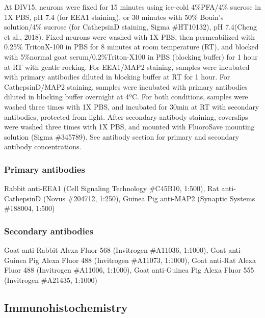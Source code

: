 At DIV15, neurons were fixed for 15 minutes using ice-cold 4\%PFA/4\% sucrose in
1X PBS, pH 7.4 (for EEA1 staining), or 30 minutes with 50\% Bouin’s solution/4\%
sucrose (for CathepsinD staining, Sigma \#HT10132), pH 7.4(Cheng et al., 2018).
Fixed neurons were washed with 1X PBS, then permeabilized with 0.25\%
TritonX-100 in PBS for 8 minutes at room temperature (RT), and blocked with
5\%normal goat serum/0.2\%Triton-X100 in PBS (blocking buffer) for 1 hour at RT
with gentle rocking. For EEA1/MAP2 staining, samples were incubated with primary
antibodies diluted in blocking buffer at RT for 1 hour. For CathepsinD/MAP2
staining, samples were incubated with primary antibodies diluted in blocking
buffer overnight at 4ºC. For both conditions, samples were washed three times
with 1X PBS, and incubated for 30min at RT with secondary antibodies, protected
from light. After secondary antibody staining, coverslips were washed three
times with 1X PBS, and mounted with FluoroSave mounting solution (Sigma
\#345789). See antibody section for primary and secondary antibody
concentrations. 

\subsubsection{Primary antibodies} Rabbit anti-EEA1 (Cell Signaling
Technology \#C45B10, 1:500), Rat anti-CathepsinD (Novus \#204712, 1:250), Guinea
Pig anti-MAP2 (Synaptic Systems \#188004, 1:500)

\subsubsection{Secondary antibodies} Goat anti-Rabbit Alexa Fluor 568
(Invitrogen \#A11036, 1:1000), Goat anti-Guinea Pig Alexa Fluor 488 (Invitrogen
\#A11073, 1:1000), Goat anti-Rat Alexa Fluor 488 (Invitrogen \#A11006, 1:1000),
Goat anti-Guinea Pig Alexa Fluor 555 (Invitrogen \#A21435, 1:1000)

\subsection{Immunohistochemistry}

